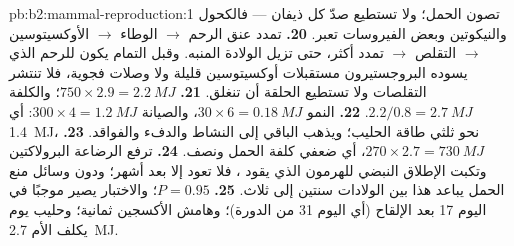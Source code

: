 \begin{solution}{pb:b2:mammal-reproduction:1}
تصون الحمل؛ ولا تستطيع صدّ كل ذيفان --- فالكحول
والنيكوتين وبعض الفيروسات تعبر.
\textbf{20.} تمدد عنق الرحم $\to$ الوطاء $\to$ الأوكسيتوسين $\to$
التقلص $\to$ تمدد أكثر، حتى تزيل الولادة المنبه.
وقبل التمام يكون للرحم الذي يسوده البروجستيرون مستقبلات
أوكسيتوسين قليلة ولا وصلات فجوية، فلا تنتشر التقلصات ولا
تستطيع الحلقة أن تنغلق.
\textbf{21.} $750\times 2.9 = \qty{2.2}{MJ}$؛ والكلفة $2.2/0.8 =
\qty{2.7}{MJ}$.
\textbf{22.} النمو $30\times 6 = \qty{0.18}{MJ}$، والصيانة
$300\times 4 = \qty{1.2}{MJ}$: أي \qty{1.4}{MJ}، نحو ثلثي
طاقة الحليب؛ ويذهب الباقي إلى النشاط والدفء والفواقد.
\textbf{23.} $270\times 2.7 = \qty{730}{MJ}$، أي ضعفي كلفة الحمل
ونصف.
\textbf{24.} ترفع الرضاعة البرولاكتين وتكبت الإطلاق النبضي
للهرمون الذي يقود ، فلا تعود 
إلا بعد أشهر؛ ودون وسائل منع الحمل يباعد هذا بين الولادات سنتين
إلى ثلاث.
\textbf{25.} $P = 0.95$؛ والاختبار يصير موجبًا في اليوم 17 بعد الإلقاح
(أي اليوم 31 من الدورة)؛ وهامش الأكسجين ثمانية؛ وحليب يوم يكلف
الأم \qty{2.7}{MJ}.
\end{solution}
